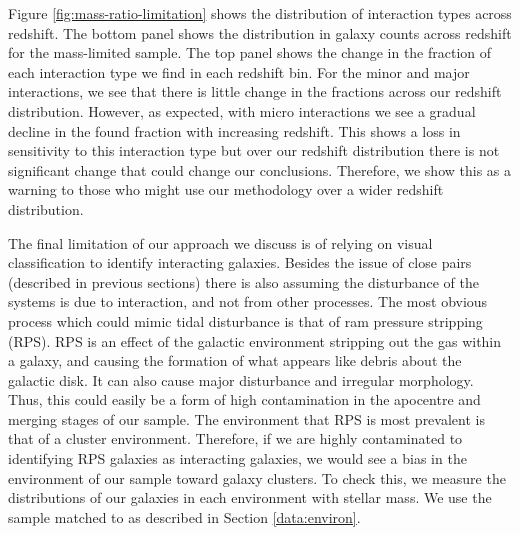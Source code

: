 Figure \ref{fig:mass-ratio-limitation} shows the distribution of interaction types across redshift. The bottom panel shows the distribution in galaxy counts across redshift for the mass-limited sample. The top panel shows the change in the fraction of each interaction type we find in each redshift bin. For the minor and major interactions, we see that there is little change in the fractions across our redshift distribution. However, as expected, with micro interactions we see a gradual decline in the found fraction with increasing redshift. This shows a loss in sensitivity to this interaction type but over our redshift distribution there is not significant change that could change our conclusions. Therefore, we show this as a warning to those who might use our methodology over a wider redshift distribution.

The final limitation of our approach we discuss is of relying on visual classification to identify interacting galaxies. Besides the issue of close pairs (described in previous sections) there is also assuming the disturbance of the systems is due to interaction, and not from other processes. The most obvious process which could mimic tidal disturbance is that of ram pressure stripping (RPS). RPS is an effect of the galactic environment stripping out the gas within a galaxy, and causing the formation of what appears like debris about the galactic disk. It can also cause major disturbance and irregular morphology. Thus, this could easily be a form of high contamination in the apocentre and merging stages of our sample. The environment that RPS is most prevalent is that of a cluster environment. Therefore, if we are highly contaminated to identifying RPS galaxies as interacting galaxies, we would see a bias in the environment of our sample toward galaxy clusters. To check this, we measure the distributions of our galaxies in each environment with stellar mass. We use the sample matched to \citet{2017ApJ...837...16D} as described in Section \ref{data:environ}.

